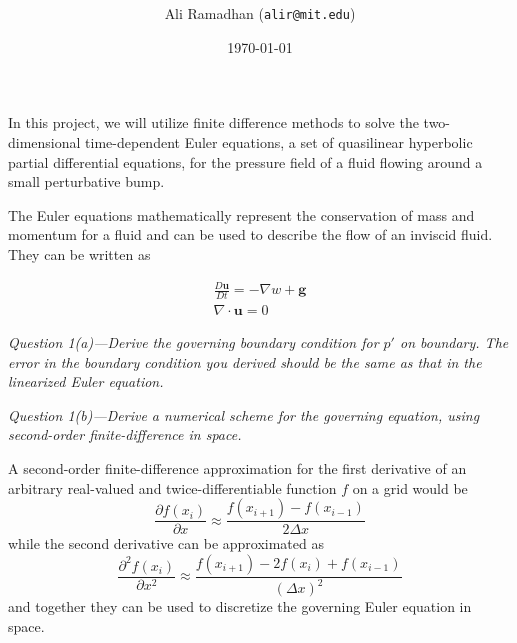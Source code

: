 \documentclass[11pt]{article}
\title{\spacedlowsmallcaps{6.339: Numerical Methods for Partial Differential Equations}\\ \spacedlowsmallcaps{Project one: Finite Difference Methods}}
\author{Ali Ramadhan (\texttt{alir@mit.edu})}
\date{\today}
\begin{document}
\maketitle

In this project, we will utilize finite difference methods to solve the two-dimensional time-dependent Euler equations, a set of quasilinear hyperbolic partial differential equations, for the pressure field of a fluid flowing around a small perturbative bump.


The Euler equations mathematically represent the conservation of mass and momentum for a fluid and can be used to describe the flow of an inviscid fluid. They can be written as

\begin{align} 
\frac{D\mathbf{u}}{Dt} = - \nabla w + \mathbf{g} \\
\nabla\cdot\mathbf{u} = 0
\end{align}


\begin{tcolorbox}
  \textit{Question 1(a)---Derive the governing boundary condition for $p'$ on boundary. The error in the boundary condition you derived should be the same as that in the linearized Euler equation.}
\end{tcolorbox}

\begin{tcolorbox}
  \textit{Question 1(b)---Derive a numerical scheme for the governing equation, using second-order finite-difference in space.}
\end{tcolorbox}
A second-order finite-difference approximation for the first derivative of an arbitrary real-valued and twice-differentiable function $f$ on a grid would be 
\begin{equation} \label{eq:firstD}
  \frac{\partial f(x_i)}{\partial x} \approx \frac{f(x_{i+1}) - f(x_{i-1})}{2\Delta x}
\end{equation}
while the second derivative can be approximated as
\begin{equation} \label{eq:secondD}
  \frac{\partial^2 f(x_i)}{\partial x^2} \approx \frac{f(x_{i+1}) - 2f(x_i) + f(x_{i-1})}{(\Delta x)^2}
\end{equation}
and together they can be used to discretize the governing Euler equation in space.
\end{document}
